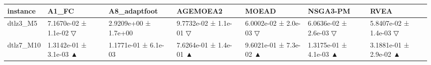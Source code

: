 \begin{tabular}{lllllll}
\toprule
instance & A1\_FC & A8\_adaptfoot & AGEMOEA2 & MOEAD & NSGA3-PM & RVEA \\
\midrule
dtlz3\_M5 & 7.1670e-02 ± 1.1e-02 ▽ & 2.9209e+00 ± 1.7e+00 & 9.7732e-02 ± 1.1e-01 ▽ & 6.0002e-02 ± 2.0e-03 ▽ & 6.0636e-02 ± 2.6e-03 ▽ & 5.8407e-02 ± 1.4e-03 ▽ \\
dtlz7\_M10 & 1.3142e-01 ± 3.1e-03 ▲ & 1.1771e-01 ± 6.1e-03 & 7.6264e-01 ± 1.4e-01 ▲ & 9.6021e-01 ± 7.3e-02 ▲ & 1.3175e-01 ± 4.1e-03 ▲ & 3.1881e-01 ± 2.9e-02 ▲ \\
\bottomrule
\end{tabular}
